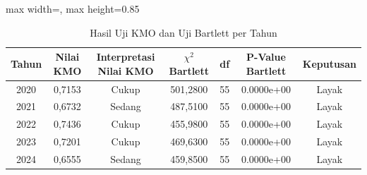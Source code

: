 \begin{table}[H]
\centering
\caption{Hasil Uji KMO dan Uji Bartlett per Tahun} \label{tab:app1kmo_bartlett}
\begin{adjustbox}{max width=\textwidth, max height=0.85\textheight}
\begin{tabular}{|c|c|c|c|c|c|c|}
\hline
\textbf{Tahun} & \textbf{Nilai KMO} & \textbf{Interpretasi Nilai KMO} & \textbf{$\chi^2$ Bartlett} & \textbf{df} & \textbf{P-Value Bartlett} & \textbf{Keputusan} \\
\hline
2020 & 0,7153 & Cukup & 501,2800 & 55 & 0.0000e+00 & Layak \\
2021 & 0,6732 & Sedang & 487,5100 & 55 & 0.0000e+00 & Layak \\
2022 & 0,7436 & Cukup & 455,9800 & 55 & 0.0000e+00 & Layak \\
2023 & 0,7201 & Cukup & 469,6300 & 55 & 0.0000e+00 & Layak \\
2024 & 0,6555 & Sedang & 459,8500 & 55 & 0.0000e+00 & Layak \\
\hline
\end{tabular}
\end{adjustbox}
\end{table}